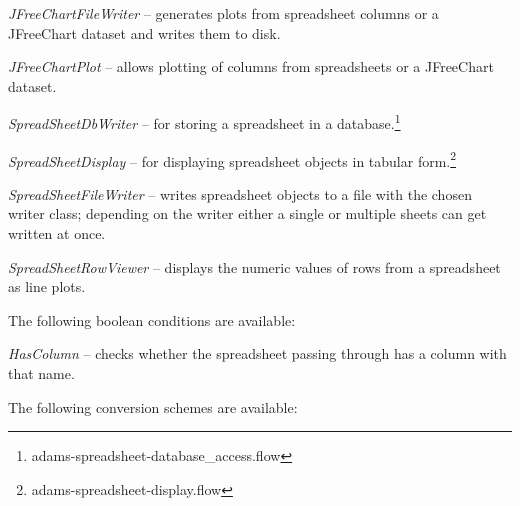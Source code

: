 \documentclass[a4paper]{book}
\begin{document}
\begin{tight_itemize}
	\item \textit{JFreeChartFileWriter} -- generates plots from spreadsheet
	columns or a JFreeChart\cite{jfreechart} dataset and writes them to disk.
	\item \textit{JFreeChartPlot} -- allows plotting of columns from
	spreadsheets or a JFreeChart\cite{jfreechart} dataset.
	\item \textit{SpreadSheetDbWriter} -- for storing a spreadsheet in a
	database.\footnote{adams-spreadsheet-database\_access.flow}
	\item \textit{SpreadSheetDisplay} -- for displaying spreadsheet objects
	in tabular form.\footnote{adams-spreadsheet-display.flow}
	\item \textit{SpreadSheetFileWriter} -- writes spreadsheet objects to a file
	with the chosen writer class; depending on the writer either a single or
	multiple sheets can get written at once.
	\item \textit{SpreadSheetRowViewer} -- displays the numeric values of
	rows from a spreadsheet as line plots.
\end{tight_itemize}
The following boolean conditions are available:
\begin{tight_itemize}
	\item \textit{HasColumn} -- checks whether the spreadsheet passing through
	has a column with that name.
\end{tight_itemize}
The following conversion schemes are available:
\end{document}
